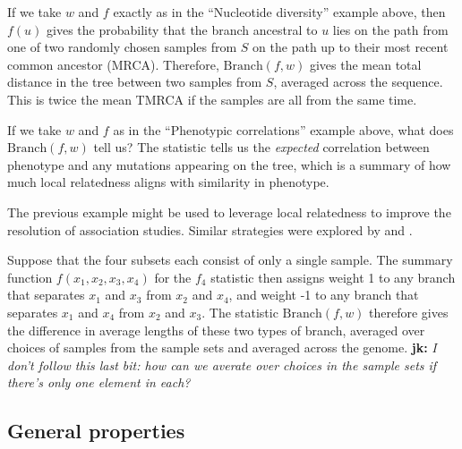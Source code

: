 \documentclass{article}
\newcommand{\branch}{\mbox{Branch}} %
\newcommand{\iw}{w} %
\newcommand{\jk}[1]{{\color{red}\textbf{jk:} \it #1}}
\begin{document}
\begin{example} \label{ex:branch_diversity}
    If we take $\iw$ and $f$ exactly as in the ``Nucleotide diversity'' example above,
    then $f(u)$ gives the probability that the branch ancestral to $u$
    lies on the path from one of two randomly chosen samples from $S$
    on the path up to their most recent common ancestor (MRCA).
    Therefore, $\branch(f, \iw)$
    gives the mean total distance in the tree between two samples from $S$,
    averaged across the sequence.
    This is twice the mean TMRCA if the samples are all from the same time.
\end{example}

\begin{example} \label{ex:branch_correlation}
    If we take $\iw$ and $f$ as in the ``Phenotypic correlations'' example above,
    what does $\branch(f, \iw)$ tell us?
    The statistic tells us the \emph{expected} correlation between phenotype and any mutations
    appearing on the tree, which is a summary of how much local relatedness
    aligns with similarity in phenotype.
\end{example}

The previous example might be used to leverage local relatedness
to improve the resolution of association studies.
Similar strategies were explored by \citet{zollner2005coalescent} and \citet{minichiello2006mapping}.

\begin{example}[Patterson's $f_4$] \label{ex:branch_f4}
    Suppose that the four subsets each consist of only a single sample.
    The summary function $f(x_1, x_2, x_3, x_4)$ for the $f_4$ statistic
    then assigns weight 1 to any branch that separates $x_1$ and $x_3$ from $x_2$ and $x_4$,
    and weight -1 to any branch that separates $x_1$ and $x_4$ from $x_2$ and $x_3$.
    The statistic $\branch(f, \iw)$ therefore
    gives the difference in average lengths of these two types of branch,
    averaged over choices of samples from the sample sets and averaged across the genome.
    \jk{I don't follow this last bit: how can we averate over choices in the
sample sets if there's only one element in each?}
\end{example}


\subsection*{General properties}
\end{document}
